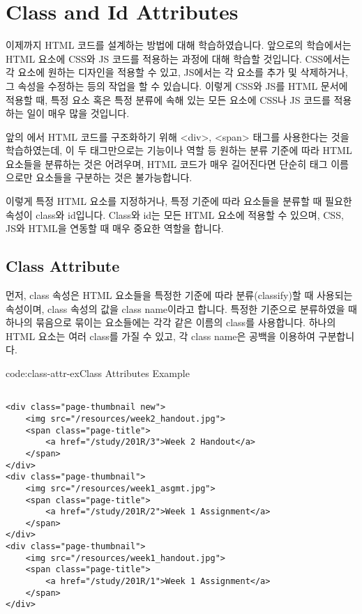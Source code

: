 \section{Class and Id Attributes} \label{sect:class-and-id-attributes}

이제까지 HTML 코드를 설계하는 방법에 대해 학습하였습니다. 앞으로의 학습에서는 HTML 요소에 CSS와 JS 코드를 적용하는 과정에 대해 학습할 것입니다. CSS에서는 각 요소에 원하는 디자인을 적용할 수 있고, JS에서는 각 요소를 추가 및 삭제하거나, 그 속성을 수정하는 등의 작업을 할 수 있습니다. 이렇게 CSS와 JS를 HTML 문서에 적용할 때, 특정 요소 혹은 특정 분류에 속해 있는 모든 요소에 CSS나 JS 코드를 적용하는 일이 매우 많을 것입니다. 

앞의 에서 HTML 코드를 구조화하기 위해 <div>, <span> 태그를 사용한다는 것을 학습하였는데, 이 두 태그만으로는 기능이나 역할 등 원하는 분류 기준에 따라 HTML 요소들을 분류하는 것은 어려우며, HTML 코드가 매우 길어진다면 단순히 태그 이름으로만 요소들을 구분하는 것은 불가능합니다. 

이렇게 특정 HTML 요소를 지정하거나, 특정 기준에 따라 요소들을 분류할 때 필요한 속성이 class와 id입니다. Class와 id는 모든 HTML 요소에 적용할 수 있으며, CSS, JS와 HTML을 연동할 때 매우 중요한 역할을 합니다. 

\subsection*{Class Attribute}
먼저, class 속성은 HTML 요소들을 특정한 기준에 따라 분류(classify)할 때 사용되는 속성이며, class 속성의 값을 class name이라고 합니다. 특정한 기준으로 분류하였을 때 하나의 묶음으로 묶이는 요소들에는 각각 같은 이름의 class를 사용합니다. 하나의 HTML 요소는 여러 class를 가질 수 있고, 각 class name은 공백을 이용하여 구분합니다. 

\begin{codeenv}{code:class-attr-ex}{Class Attributes Example}\begin{verbatim}

<div class="page-thumbnail new">
    <img src="/resources/week2_handout.jpg">
    <span class="page-title">
        <a href="/study/201R/3">Week 2 Handout</a>
    </span>
</div>
<div class="page-thumbnail">
    <img src="/resources/week1_asgmt.jpg">
    <span class="page-title">
        <a href="/study/201R/2">Week 1 Assignment</a>
    </span>
</div>
<div class="page-thumbnail">
    <img src="/resources/week1_handout.jpg">
    <span class="page-title">
        <a href="/study/201R/1">Week 1 Assignment</a>
    </span>
</div>
\end{verbatim}
\end{codeenv}

